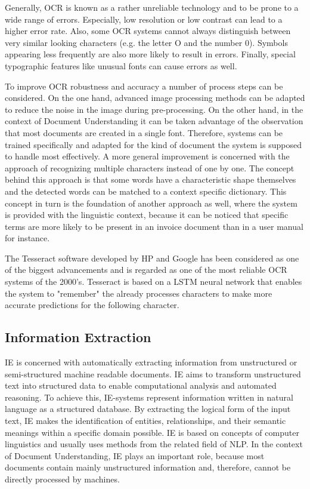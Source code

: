 Generally, \ac{OCR} is known as a rather unreliable technology and to be prone to a wide range of errors. Especially, low resolution or low contrast can lead to a higher error rate. Also, some \ac{OCR} systems cannot always distinguish between very similar looking characters (e.g. the letter O and the number 0). Symbols appearing less frequently are also more likely to result in errors. Finally, special typographic features like unusual fonts can cause errors as well.
\cite{nagy1999optical,baird2004robust}

To improve \ac{OCR} robustness and accuracy a number of process steps can be considered. On the one hand, advanced image processing methods can be adapted to reduce the noise in the image during pre-processing. On the other hand, in the context of Document Understanding it can be taken advantage of the observation that most documents are created in a single font. Therefore, systems can be trained specifically and adapted for the kind of document the system is supposed to handle most effectively.
A more general improvement is concerned with the approach of recognizing multiple characters instead of one by one. The concept behind this approach is that some words have a characteristic shape themselves and the detected words can be matched to a context specific dictionary. This concept in turn is the foundation of another approach as well, where the system is provided with the linguistic context, because it can be noticed that specific terms are more likely to be present in an invoice document than in a user manual for instance. \cite{nagy1999optical,baird2004robust}

The Tesseract software developed by HP and Google has been considered as one of the biggest advancements and is regarded as one of the most reliable \ac{OCR} systems of the 2000's. Tesseract is based on a \ac{LSTM} neural network that enables the system to "remember" the already processes characters to make more accurate predictions for the following character. \cite{Tesseract,hochreiter1997long}

\subsection{Information Extraction}
\acf{IE} is concerned with automatically extracting information from unstructured or semi-structured machine readable documents. \ac{IE} aims to transform unstructured text into structured data to enable computational analysis and automated reasoning. To achieve this, \ac{IE}-systems represent information written in natural language as a structured database. By extracting the logical form of the input text, \ac{IE} makes the identification of entities, relationships, and their semantic meanings within a specific domain possible. \ac{IE} is based on concepts of computer linguistics and usually uses methods from the related field of \acf{NLP}. In the context of Document Understanding, \ac{IE} plays an important role, because most documents contain mainly unstructured information and, therefore, cannot be directly processed by machines. \cite{hobbs2010information,church1995commercial}

